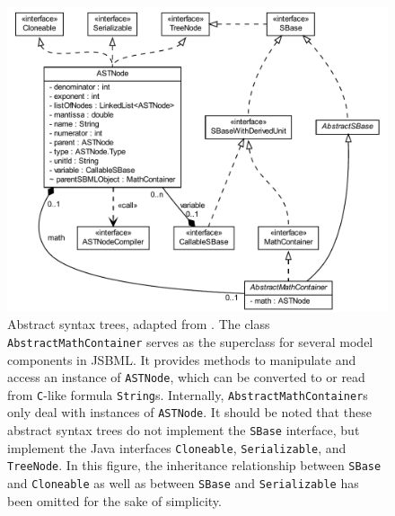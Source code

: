 \documentclass[
  BCOR12mm,
  letterpaper,
  11pt,
  headsepline,
  pointlessnumbers,
  tablecaptionabove,
  onelinecaption,
  headinclude,
  appendixprefix,
  idxtotoc,
  bibtotoc,
  twoside,
  titlepage
]{scrartcl}
\begin{document}
\begin{figure}[t!]
 \centering
 \includegraphics[width=.8\textwidth]{img/MathContainerClass}
 \caption[Abstract syntax trees]{Abstract syntax trees, adapted from
 \citep{Draeger2011}. The class \texttt{AbstractMathContainer} serves as the
 superclass for several model components in JSBML. It provides methods to
 manipulate and access an instance  of \texttt{ASTNode}, which can be converted
 to or read from \texttt{C}-like formula \texttt{String}s. Internally,
 \texttt{AbstractMathContainer}s only deal with instances of \texttt{ASTNode}.
 It should be noted that these abstract syntax trees do not implement the
 \texttt{SBase} interface, but implement the Java interfaces
 \texttt{Cloneable}, \texttt{Serializable}, and \texttt{TreeNode}. In this
 figure, the inheritance relationship between
 \texttt{SBase} and \texttt{Cloneable} as well as between \texttt{SBase} and
 \texttt{Serializable} has been omitted for the sake of simplicity.}
 \label{fig:MathContainer}
\end{figure}
\end{document}
